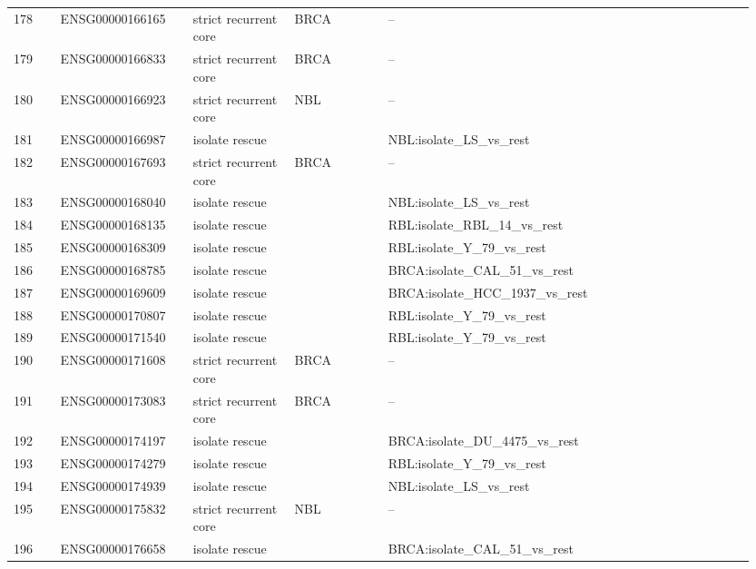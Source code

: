 \begin{landscape}
{\begin{longtable}{p{0.06\linewidth}p{0.17\linewidth}p{0.13\linewidth}p{0.12\linewidth}p{0.47\linewidth}}
178 & ENSG00000166165 & strict recurrent core & BRCA & -- \\
179 & ENSG00000166833 & strict recurrent core & BRCA & -- \\
180 & ENSG00000166923 & strict recurrent core & NBL & -- \\
181 & ENSG00000166987 & isolate rescue &  & NBL:isolate\_\allowbreak{}LS\_\allowbreak{}vs\_\allowbreak{}rest \\
182 & ENSG00000167693 & strict recurrent core & BRCA & -- \\
183 & ENSG00000168040 & isolate rescue &  & NBL:isolate\_\allowbreak{}LS\_\allowbreak{}vs\_\allowbreak{}rest \\
184 & ENSG00000168135 & isolate rescue &  & RBL:isolate\_\allowbreak{}RBL\_\allowbreak{}14\_\allowbreak{}vs\_\allowbreak{}rest \\
185 & ENSG00000168309 & isolate rescue &  & RBL:isolate\_\allowbreak{}Y\_\allowbreak{}79\_\allowbreak{}vs\_\allowbreak{}rest \\
186 & ENSG00000168785 & isolate rescue &  & BRCA:isolate\_\allowbreak{}CAL\_\allowbreak{}51\_\allowbreak{}vs\_\allowbreak{}rest \\
187 & ENSG00000169609 & isolate rescue &  & BRCA:isolate\_\allowbreak{}HCC\_\allowbreak{}1937\_\allowbreak{}vs\_\allowbreak{}rest \\
188 & ENSG00000170807 & isolate rescue &  & RBL:isolate\_\allowbreak{}Y\_\allowbreak{}79\_\allowbreak{}vs\_\allowbreak{}rest \\
189 & ENSG00000171540 & isolate rescue &  & RBL:isolate\_\allowbreak{}Y\_\allowbreak{}79\_\allowbreak{}vs\_\allowbreak{}rest \\
190 & ENSG00000171608 & strict recurrent core & BRCA & -- \\
191 & ENSG00000173083 & strict recurrent core & BRCA & -- \\
192 & ENSG00000174197 & isolate rescue &  & BRCA:isolate\_\allowbreak{}DU\_\allowbreak{}4475\_\allowbreak{}vs\_\allowbreak{}rest \\
193 & ENSG00000174279 & isolate rescue &  & RBL:isolate\_\allowbreak{}Y\_\allowbreak{}79\_\allowbreak{}vs\_\allowbreak{}rest \\
194 & ENSG00000174939 & isolate rescue &  & NBL:isolate\_\allowbreak{}LS\_\allowbreak{}vs\_\allowbreak{}rest \\
195 & ENSG00000175832 & strict recurrent core & NBL & -- \\
196 & ENSG00000176658 & isolate rescue &  & BRCA:isolate\_\allowbreak{}CAL\_\allowbreak{}51\_\allowbreak{}vs\_\allowbreak{}rest \\

\end{longtable}}
\end{landscape}
